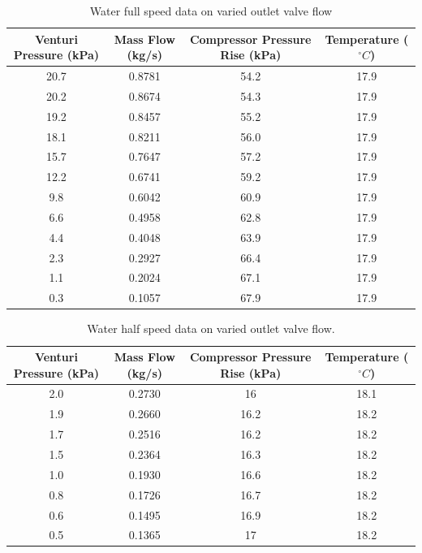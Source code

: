 \documentclass{article}
\begin{document}
\begin{table}[H]
    \centering
    \begin{tabular}{cccc}
        \hline
        Venturi Pressure (kPa) & Mass Flow (kg/s) & Compressor Pressure Rise (kPa) & Temperature ($^\circ C$)\\
        \hline
        20.7 & 0.8781 & 54.2 & 17.9 \\
        20.2 & 0.8674 & 54.3 & 17.9 \\
        19.2 & 0.8457 & 55.2 & 17.9 \\
        18.1 & 0.8211 & 56.0 & 17.9 \\
        15.7 & 0.7647 & 57.2 & 17.9 \\
        12.2 & 0.6741 & 59.2 & 17.9 \\
        9.8 & 0.6042 & 60.9 & 17.9 \\
        6.6 & 0.4958 & 62.8 & 17.9 \\
        4.4 & 0.4048 & 63.9 & 17.9 \\
        2.3 & 0.2927 & 66.4 & 17.9 \\
        1.1 & 0.2024 & 67.1 & 17.9 \\
        0.3 & 0.1057 & 67.9 & 17.9 \\
        \hline
    \end{tabular}
    \caption{Water full speed data on varied outlet valve flow}
    \label{tab:water_full_speed_outlet_data}
\end{table}

\begin{table}[H]
    \centering
    \begin{tabular}{cccc}
        \hline
        Venturi Pressure (kPa) & Mass Flow (kg/s) & Compressor Pressure Rise (kPa) & Temperature ($^\circ C$)\\        \hline
        2.0 & 0.2730 & 16 & 18.1 \\
        1.9 & 0.2660 & 16.2 & 18.2 \\
        1.7 & 0.2516 & 16.2 & 18.2 \\
        1.5 & 0.2364 & 16.3 & 18.2 \\
        1.0 & 0.1930 & 16.6 & 18.2 \\
        0.8 & 0.1726 & 16.7 & 18.2 \\
        0.6 & 0.1495 & 16.9 & 18.2 \\
        0.5 & 0.1365 & 17 & 18.2 \\
        \hline
    \end{tabular}
    \caption{Water half speed data on varied outlet valve flow.}
    \label{tab:water_half_speed_outlet_data}
\end{table}
\end{document}

